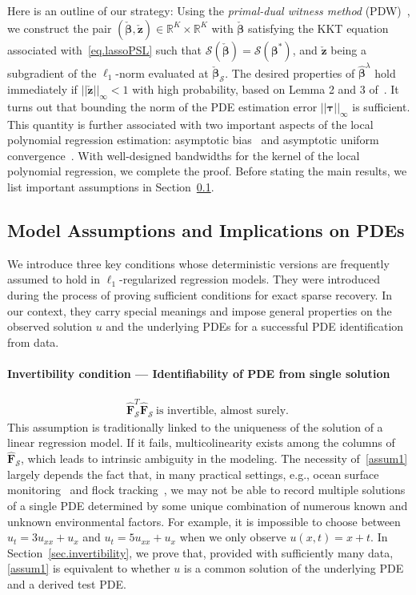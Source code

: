 \documentclass[a4paper,11pt]{article}
\newcommand{\btau}{\bm{\tau}}
\newcommand{\bbeta}{\bm{\beta}}
\newcommand{\bF}{\mathbf{F}}
\newcommand{\mS}{\mathcal{S}}
\begin{document}
Here is an outline of our strategy: Using the \textit{primal-dual witness method} (PDW)~\cite{wainwright2009sharp}, we construct the pair $(\check{\bbeta},\check{\mathbf{z}})\in\mathbb{R}^{K}\times\mathbb{R}^{K}$ with $\check{\bbeta}$ satisfying the KKT equation associated with~\eqref{eq.lassoPSL} such that $\mS(\check{\bbeta})=\mS(\bbeta^*)$, and $\check{\mathbf{z}}$ being a subgradient of the $\ell_1$-norm evaluated at $\check{\bbeta}_\mS$. The desired properties of $\widehat{\bbeta}^\lambda$ hold immediately if $||\check{\mathbf{z}}||_\infty<1$ with high probability, based on Lemma 2 and 3 of~\cite{wainwright2009sharp}. It turns out that bounding the norm of the PDE estimation error  $||\btau||_\infty$ is sufficient. This quantity is further associated with two important aspects of the local polynomial regression estimation: asymptotic bias~\cite{fan1997local} and asymptotic uniform convergence~\cite{mack1982weak}. With well-designed bandwidths for the kernel of the local polynomial regression, we complete the proof. Before stating the main results, we list important assumptions in Section~\ref{sec.assumptions}.



\subsection{Model Assumptions and Implications on PDEs}\label{sec.assumptions}
We introduce three key conditions whose deterministic versions are frequently assumed to hold in $\ell_1$-regularized regression models. They were introduced during the process of proving sufficient conditions for exact sparse recovery. In our context, they carry special meanings and impose general properties on the observed solution $u$ and the underlying PDEs for a successful PDE identification from data.  
 
\paragraph{Invertibility condition --- Identifiability of PDE from single solution}
\begin{align}
\widehat{\bF}_{\mS}^T\widehat{\bF}_\mS~\text{is invertible, almost surely.}~\label{assum1}\tag{A1}
\end{align}
This assumption is traditionally linked to the uniqueness of the solution of a linear regression model. If it fails, multicolinearity exists among the columns of $\widehat{\bF}_\mS$, which leads to intrinsic ambiguity in the modeling. The necessity of~\eqref{assum1} largely depends the fact that, in many practical settings, e.g., ocean surface monitoring~\cite{fox2001monitoring} and flock tracking~\cite{michele2016radar}, we may not be able to record multiple solutions of a single PDE determined by some unique combination of numerous known and unknown environmental factors. For example, it is impossible to choose between $u_t=3u_{xx}+u_x$ and $u_t = 5u_{xx}+u_x$ when we only observe $u(x,t)=x+t$. In Section~\ref{sec.invertibility}, we prove that, provided with sufficiently many data, \eqref{assum1} is equivalent to whether $u$ is a common solution of the underlying PDE and a derived test PDE.
\end{document}
